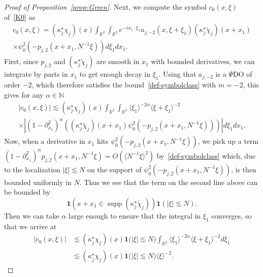 \documentclass[10pt]{amsart}
\theoremstyle{definition}\newtheorem{defi}[theo]{Definition}\newtheorem{rema}[theo]{Remark}\newtheorem{exam}[theo]{Example}\newtheorem{exem}[theo]{Example}\newtheorem{nota}[theo]{Notation}
\newcommand{\R}{\mathbb{R}}
\newcommand{\N}{\mathbb{N}}
\DeclareMathOperator*{\supp}{supp}
\newcommand{\ind}{\mathbf{1}}
\newcommand{\al}{\alpha}
\newcommand{\kk}{\kappa}
\newcommand{\wt}{\widetilde}
\newcommand{\les}{\lesssim}
\newcommand{\jb}[1] {\langle #1 \rangle}
\begin{document}
\begin{proof}[Proof of Proposition~\ref{prop-Green}]
Next, we compute the symbol $c_0(x,\xi)$ of~\eqref{K0} as
\begin{multline}\label{def-c0}
c_0(x,\xi)=\left(\kk_j^\star\chi_j\right)(x)\int_{\R^2}\int_{\R^2}e^{-ix_1\cdot\xi_1}a_{j,-2}(x,\xi+\xi_1)\left(\kk_j^\star\wt\chi_j\right)(x+x_1)\\
\times\psi_0^2\left(-p_{j,2}\left(x+x_1,N^{-1}\xi\right)\right)d\xi_1dx_1.
\end{multline}
First, since $p_{j,2}$ and $(\kk_j^\star\wt\chi_j)$ are smooth in $x_1$ with bounded derivatives, we can integrate by parts in $x_1$ to get enough decay in $\xi_1$. Using that $a_{j,-2}$ is a $\Psi$DO of order $-2$, which therefore satisfies the bound~\eqref{def-symbolclass} with $m=-2$, this gives for any $\al \in \N$
\begin{multline*}
|c_0(x,\xi)|\les\left(\kk_j^\star\chi_j\right)(x)\int_{\R^2}\int_{\R^2}\jb{\xi_1}^{-2\al}\jb{\xi+\xi_1}^{-2}\\
\times\left|\left(1-\partial_{x_1}^2\right)^{\al}\left(\left(\kk_j^\star\wt\chi_j\right)(x+x_1)\psi_0^2\left(-p_{j,2}\left(x+x_1,N^{-1}\xi\right)\right)\right)\right|d\xi_1dx_1.
\end{multline*}
Now, when a derivative in $x_1$ hits $\psi_0^2(-p_{j,2}(x+x_1,N^{-1}\xi))$, we pick up a term $(1-\partial_{x_1}^2)^\al p_{j,2}(x+x_1,N^{-1}\xi)=O(\jb{N^{-1}\xi}^2)$ by~\eqref{def-symbolclass} which, due to the localization $|\xi|\les N$ on the support of $\psi_0^2(-p_{j,2}(x+x_1,N^{-1}\xi))$, is then bounded uniformly in $N$. Thus we see that the term on the second line above can be bounded by
\begin{equation*}
\ind\left(x+x_1\in\supp\left(\kk_j^\star\wt
\chi_j\right)\right)\ind(|\xi|\les N).
\end{equation*}
Then we can take $\al$ large enough to ensure that the integral in $\xi_1$ converges, so that we arrive at
\begin{equation}\label{c0}
\begin{split}
|c_0(x,\xi)| &\les \left(\kk_j^\star\chi_j\right)(x)\ind\big(|\xi|\les N\big)\int_{\R^2}\jb{\xi_1}^{-2\alpha}\jb{\xi+\xi_1}^{-2}d\xi_1
\\
&\les \left(\kk_j^\star\chi_j\right)(x)\ind\big(|\xi|\les N\big)\jb{\xi}^{-2}.
\end{split}
\end{equation}


\end{proof}
\end{document}
